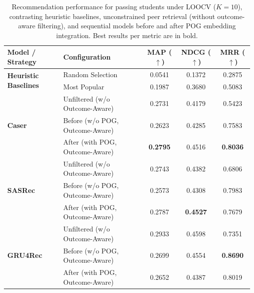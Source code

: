 \begin{table}[th!]
\centering
\caption{Recommendation performance for passing students under LOOCV ($K=10$), contrasting heuristic baselines, unconstrained peer retrieval (without outcome-aware filtering), and sequential models before and after POG embedding integration. Best results per metric are in bold.}
\label{tab:respass}
\small
\begin{tabular}{llccc}
\hline
\textbf{Model / Strategy} & \textbf{Configuration} & \textbf{MAP} ($\uparrow$) & \textbf{NDCG} ($\uparrow$) & \textbf{MRR} ($\uparrow$) \\
\hline
\multirow{2}{*}{\textbf{Heuristic Baselines}} 
 & Random Selection & 0.0541 & 0.1372 & 0.2875 \\
 & Most Popular     & 0.1987 & 0.3680 & 0.5083 \\
\hline
\multirow{3}{*}{\textbf{Caser}} 
 & Unfiltered (w/o Outcome-Aware)  & 0.2731 & 0.4179 & 0.5423 \\
 & Before (w/o POG, Outcome-Aware) & 0.2623 & 0.4285 & 0.7583 \\
 & After (with POG, Outcome-Aware) & \textbf{0.2795} & 0.4516 & \textbf{0.8036} \\
\hline
\multirow{3}{*}{\textbf{SASRec}} 
 & Unfiltered (w/o Outcome-Aware)  & 0.2743 & 0.4382 & 0.6806 \\
 & Before (w/o POG, Outcome-Aware) & 0.2573 & 0.4308 & 0.7983 \\
 & After (with POG, Outcome-Aware) & 0.2787 & \textbf{0.4527} & 0.7679 \\
\hline
\multirow{3}{*}{\textbf{GRU4Rec}} 
 & Unfiltered (w/o Outcome-Aware)  & 0.2933 & 0.4598 & 0.7351 \\
 & Before (w/o POG, Outcome-Aware) & 0.2699 & 0.4554 & \textbf{0.8690} \\
 & After (with POG, Outcome-Aware) & 0.2652 & 0.4387 & 0.8019 \\
\hline
\end{tabular}
\end{table}
